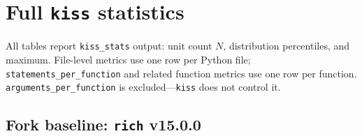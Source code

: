 \documentclass[11pt]{article}
\begin{document}
\appendix
\section{Full \texttt{kiss} statistics}
\label{app:kiss-stats}

All tables report \texttt{kiss\_stats} output: unit count $N$, distribution percentiles, and maximum. File-level metrics use one row per Python file; \texttt{statements\_per\_function} and related function metrics use one row per function. \texttt{arguments\_per\_function} is excluded---\texttt{kiss} does not control it.

\subsection{Fork baseline: \texttt{rich} v15.0.0}
\label{app:kiss-baseline}
\end{document}
